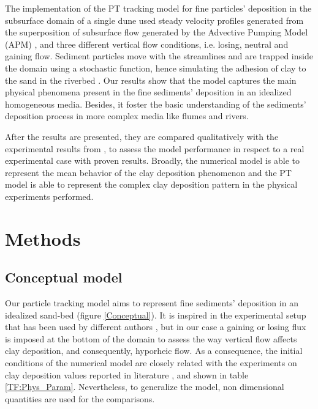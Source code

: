 \documentclass[draft,linenumbers]{agujournal2018}
\begin{document}
The implementation of the PT tracking model for fine particles' deposition in the subsurface domain of a single dune used steady velocity profiles generated from the superposition of subsurface flow generated by the Advective Pumping Model (APM) \citep{Elliott1997,Elliott1997b}, and three different vertical flow conditions, i.e. losing, neutral and gaining flow. Sediment particles move with the streamlines and are trapped inside the domain using a stochastic function, hence simulating the adhesion of clay to the sand in the riverbed \citep{Li2017}. Our results show that the model captures the main physical phenomena present in the fine sediments' deposition in an idealized homogeneous media. Besides, it foster the basic understanding of the sediments' deposition process in more complex media like flumes and rivers.

After the results are presented, they are compared qualitatively with the experimental results from \citet{Fox2014,Fox2018}, to assess the model performance in respect to a real experimental case with proven results. Broadly, the numerical model is able to represent the mean behavior of the clay deposition phenomenon and the PT model is able to represent the complex clay deposition pattern in the physical experiments performed. 

\section{Methods} \label{Methods}

\subsection{Conceptual model} \label{Conceptual_Model}

Our particle tracking model aims to represent fine sediments' deposition in an idealized sand-bed (figure \ref{Conceptual}). It is inspired in the experimental setup that has been used by different authors \citep{Elliott1997b,Elliott1997b,Packman2000b,Fox2014,Fox2018}, but in our case a gaining or losing flux is imposed at the bottom of the domain to assess the way vertical flow affects clay deposition, and consequently, hyporheic flow. As a consequence, the initial conditions of the numerical model are closely related with the experiments on clay deposition values reported in literature \citep{Packman2000,Fox2014,Fox2018}, and shown in table \ref{TF:Phys_Param}. Nevertheless, to generalize the model, non dimensional quantities are used for the comparisons.
\end{document}
